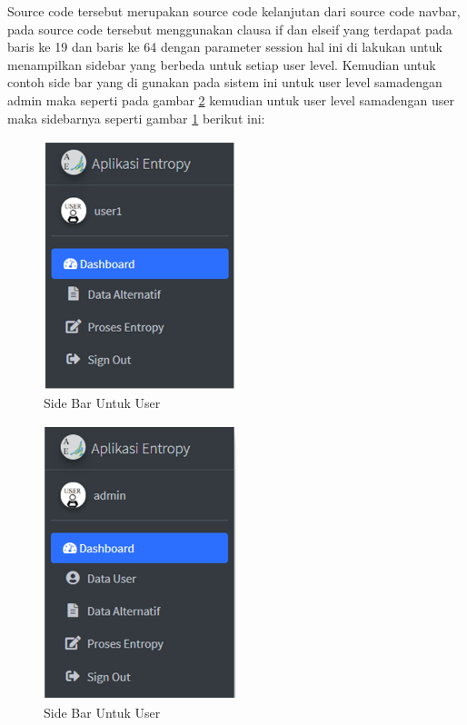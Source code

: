 Source code tersebut merupakan source code kelanjutan dari source code navbar, pada source code tersebut menggunakan clausa if dan elseif yang terdapat pada baris ke 19 dan baris ke 64  dengan parameter session hal ini di lakukan untuk menampilkan sidebar yang berbeda untuk setiap user level. Kemudian untuk contoh side bar yang di gunakan pada sistem ini untuk user level samadengan admin maka seperti pada gambar \ref{ve3} kemudian untuk user level samadengan user maka sidebarnya seperti gambar \ref{ve2} berikut ini:
\pagebreak
\begin{figure}[!htbp]
	\centerline{\includegraphics[width=0.50\textwidth]{figures/view/2.png}}
	\caption{Side Bar Untuk User}
	\label{ve2}
\end{figure}

\begin{figure}[!htbp]
	\centerline{\includegraphics[width=0.50\textwidth]{figures/view/3.png}}
	\caption{Side Bar Untuk User}
	\label{ve3}
\end{figure}

